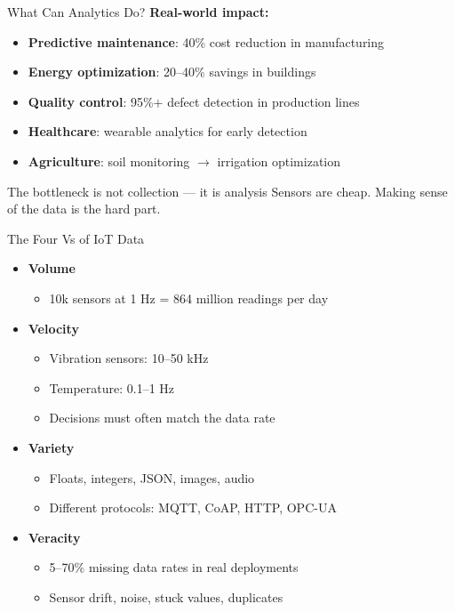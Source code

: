 \documentclass[aspectratio=169,11pt]{beamer}
\begin{document}
\begin{frame}{What Can Analytics Do?}
    \textbf{Real-world impact:}
    \begin{itemize}
        \item \textbf{Predictive maintenance}: 40\% cost reduction in manufacturing
        \item \textbf{Energy optimization}: 20--40\% savings in buildings
        \item \textbf{Quality control}: 95\%+ defect detection in production lines
        \item \textbf{Healthcare}: wearable analytics for early detection
        \item \textbf{Agriculture}: soil monitoring $\rightarrow$ irrigation optimization
    \end{itemize}

    \vspace{0.3cm}
    \begin{block}{The bottleneck is not collection --- it is analysis}
        Sensors are cheap. Making sense of the data is the hard part.
    \end{block}
\end{frame}

\begin{frame}{The Four Vs of IoT Data}
    \begin{itemize}
        \item \textbf{Volume}
        \begin{itemize}
            \item 10k sensors at 1 Hz = 864 million readings per day
        \end{itemize}
        \item \textbf{Velocity}
        \begin{itemize}
            \item Vibration sensors: 10--50 kHz
            \item Temperature: 0.1--1 Hz
            \item Decisions must often match the data rate
        \end{itemize}
        \item \textbf{Variety}
        \begin{itemize}
            \item Floats, integers, JSON, images, audio
            \item Different protocols: MQTT, CoAP, HTTP, OPC-UA
        \end{itemize}
        \item \textbf{Veracity}
        \begin{itemize}
            \item 5--70\% missing data rates in real deployments
            \item Sensor drift, noise, stuck values, duplicates
        \end{itemize}
    \end{itemize}
\end{frame}
\end{document}
